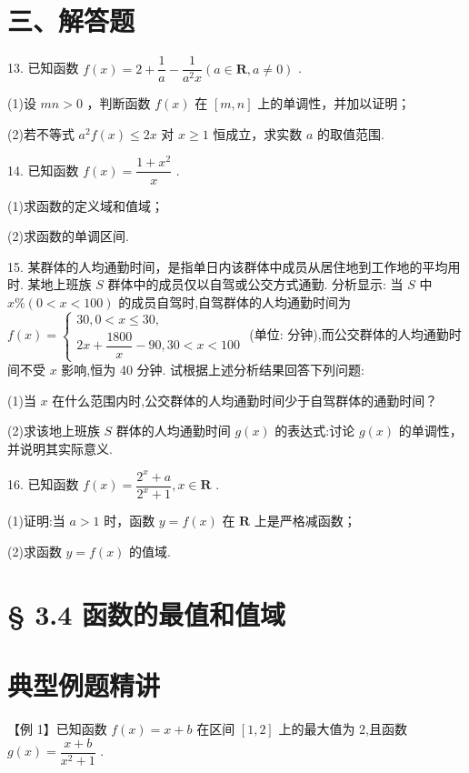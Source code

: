 \section*{三、解答题}

13. 已知函数 $f\left( x\right)  = 2 + \dfrac{1}{a} - \dfrac{1}{{a}^{2}x}\left( {a \in  \mathbf{R},a \neq  0}\right)$ .

(1)设 ${mn} > 0$ ，判断函数 $f\left( x\right)$ 在 $\left\lbrack  {m,n}\right\rbrack$ 上的单调性，并加以证明；

(2)若不等式 ${a}^{2}f\left( x\right)  \leq  {2x}$ 对 $x \geq  1$ 恒成立，求实数 $a$ 的取值范围.

14. 已知函数 $f\left( x\right)  = \dfrac{1 + {x}^{2}}{x}$ .

(1)求函数的定义域和值域；

(2)求函数的单调区间.


15. 某群体的人均通勤时间，是指单日内该群体中成员从居住地到工作地的平均用时. 某地上班族 $S$ 群体中的成员仅以自驾或公交方式通勤. 分析显示: 当 $S$ 中 $x\% \left( {0 < x < {100}}\right)$ 的成员自驾时,自驾群体的人均通勤时间为 $f\left( x\right)  = \left\{  \begin{array}{l} {30},0 < x \leq  {30}, \\  {2x} + \dfrac{1800}{x} - {90},{30} < x < {100} \end{array}\right.$ (单位: 分钟),而公交群体的人均通勤时间不受 $x$ 影响,恒为 40 分钟. 试根据上述分析结果回答下列问题:

(1)当 $x$ 在什么范围内时,公交群体的人均通勤时间少于自驾群体的通勤时间？

(2)求该地上班族 $S$ 群体的人均通勤时间 $g\left( x\right)$ 的表达式:讨论 $g\left( x\right)$ 的单调性，并说明其实际意义.

16. 已知函数 $f\left( x\right)  = \dfrac{{2}^{x} + a}{{2}^{x} + 1},x \in  \mathbf{R}$ .

(1)证明:当 $a > 1$ 时，函数 $y = f\left( x\right)$ 在 $\mathbf{R}$ 上是严格减函数；

(2)求函数 $y = f\left( x\right)$ 的值域.

\section*{§ 3.4 函数的最值和值域}

\section*{典型例题精讲}

【例 1】已知函数 $f\left( x\right)  = x + b$ 在区间 $\left\lbrack  {1,2}\right\rbrack$ 上的最大值为 2,且函数 $g\left( x\right)  = \dfrac{x + b}{{x}^{2} + 1}$ .

